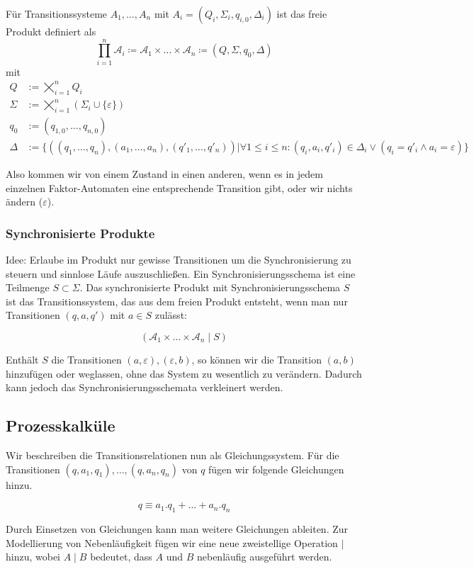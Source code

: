 \documentclass[11pt]{scrartcl}
\begin{document}
Für Transitionssysteme $A_1, \ldots, A_n$ mit $A_i = (Q_i, \Sigma_i, q_{i,0}, \Delta_i)$ ist das freie Produkt definiert als \[\prod\limits_{i=1}^n \mathcal A_i \coloneqq \mathcal A_1 \times \ldots \times \mathcal A_n \coloneqq (Q, \Sigma,q_0, \Delta)\] mit
\begin{align*}
	Q &:= \bigtimes_{i=1}^n Q_i	\\
    \Sigma &:= \bigtimes_{i=1}^n (\Sigma_i \cup \{\varepsilon\}) \\
    q_0 &:= (q_{1,0}, \ldots, q_{n,0}) \\
    \Delta &:= \{ ((q_1,\ldots,q_n),(a_1,\ldots,a_n),(q'_1,\ldots,q'_n)) \vert \forall 1 \leq i \leq n: (q_i,a_i,q'_i) \in \Delta_i \vee (q_i = q'_i \wedge a_i = \varepsilon) \}
\end{align*}

Also kommen wir von einem Zustand in einen anderen, wenn es in jedem einzelnen Faktor-Automaten eine entsprechende Transition gibt, oder wir nichts ändern ($\varepsilon$).

\subsubsection{Synchronisierte Produkte}
Idee: Erlaube im Produkt nur gewisse Transitionen um die Synchronisierung zu steuern und sinnlose Läufe auszuschließen. Ein Synchronisierungsschema ist eine Teilmenge $S \subset \Sigma$. Das synchronisierte Produkt mit Synchronisierungsschema $S$ ist das Transitionssystem, das aus dem freien Produkt entsteht, wenn man nur Transitionen $(q,a,q')$ mit $a \in S$ zulässt:

\[(\mathcal A_1 \times \ldots \times \mathcal A_n \mid S)\]

Enthält $S$ die Transitionen $(a, \varepsilon), (\varepsilon,b)$, so können wir die Transition $(a,b)$ hinzufügen oder weglassen, ohne das System zu wesentlich zu verändern. Dadurch kann jedoch das Synchronisierungsschemata verkleinert werden.

\subsection{Prozesskalküle}

Wir beschreiben die Transitionsrelationen nun als Gleichungssystem. Für die Transitionen $(q,a_1,q_1),\ldots, (q,a_n,q_n)$ von $q$ fügen wir folgende Gleichungen hinzu.

\[q \equiv a_1.q_1 + \ldots + a_n.q_n\]

Durch Einsetzen von Gleichungen kann man weitere Gleichungen ableiten. Zur Modellierung von Nebenläufigkeit fügen wir eine neue zweistellige Operation $\mid$ hinzu, wobei $A\mid B$ bedeutet, dass $A$ und $B$ nebenläufig ausgeführt werden.
\end{document}
